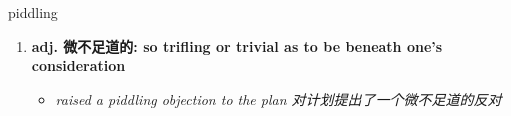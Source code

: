 
\begin{frame}
{\huge piddling}
\begin{center}
\begin{enumerate}\Large
  \item \textbf{adj. 微不足道的: so trifling or trivial as to be beneath one's consideration}
  \begin{itemize}
    \item \em{\Large{raised a piddling objection to the plan 对计划提出了一个微不足道的反对}}
  \end{itemize}
\end{enumerate}
\end{center}
\end{frame}
